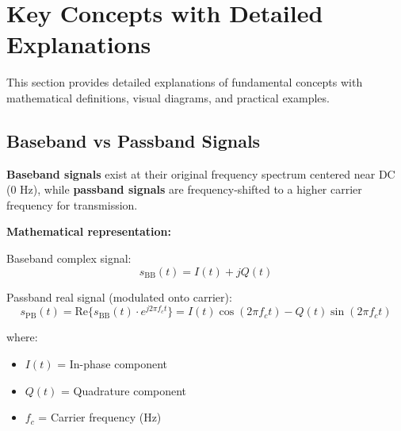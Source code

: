 \section{Key Concepts with Detailed Explanations}\label{sec:key-concepts}

This section provides detailed explanations of fundamental concepts with mathematical definitions, visual diagrams, and practical examples.

\subsection{Baseband vs Passband Signals}

\textbf{Baseband signals} exist at their original frequency spectrum centered near DC (0 Hz), while \textbf{passband signals} are frequency-shifted to a higher carrier frequency for transmission.

\textbf{Mathematical representation:}

Baseband complex signal:
\begin{equation}
s_{\text{BB}}(t) = I(t) + jQ(t)
\label{eq:baseband}
\end{equation}

Passband real signal (modulated onto carrier):
\begin{equation}
s_{\text{PB}}(t) = \text{Re}\{s_{\text{BB}}(t) \cdot e^{j2\pi f_c t}\} = I(t)\cos(2\pi f_c t) - Q(t)\sin(2\pi f_c t)
\label{eq:passband}
\end{equation}

where:
\begin{itemize}
\item $I(t)$ = In-phase component
\item $Q(t)$ = Quadrature component  
\item $f_c$ = Carrier frequency (Hz)
\end{itemize}

\begin{center}
\end{center}

